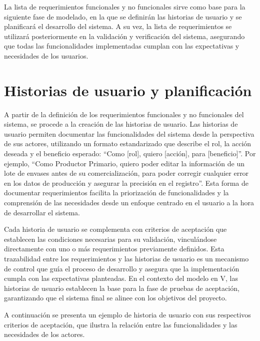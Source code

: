 La lista de requerimientos funcionales y no funcionales sirve como base para la siguiente fase de modelado, en la que se definirán las historias de usuario y se planificará el desarrollo del sistema. A su vez, la lista de requerimientos se utilizará posteriormente en la validación y verificación del sistema, asegurando que todas las funcionalidades implementadas cumplan con las expectativas y necesidades de los usuarios.

\section{Historias de usuario y planificación}
\label{sec:user-stories}

A partir de la definición de los requerimientos funcionales y no funcionales del sistema, se procede a la creación de las historias de usuario. Las historias de usuario permiten documentar las funcionalidades del sistema desde la perspectiva de sus actores, utilizando un formato estandarizado que describe el rol, la acción deseada y el beneficio esperado: ``Como [rol], quiero [acción], para [beneficio]''. Por ejemplo, ``Como Productor Primario, quiero poder editar la información de un lote de envases antes de su comercialización, para poder corregir cualquier error en los datos de producción y asegurar la precisión en el registro''. Esta forma de documentar requerimientos facilita la priorización de funcionalidades y la comprensión de las necesidades desde un enfoque centrado en el usuario a la hora de desarrollar el sistema.

Cada historia de usuario se complementa con criterios de aceptación que establecen las condiciones necesarias para su validación, vinculándose directamente con uno o más requerimientos previamente definidos. Esta trazabilidad entre los requerimientos y las historias de usuario es un mecanismo de control que guía el proceso de desarrollo y asegura que la implementación cumpla con las expectativas planteadas. En el contexto del modelo en V, las historias de usuario establecen la base para la fase de pruebas de aceptación, garantizando que el sistema final se alinee con los objetivos del proyecto.

A continuación se presenta un ejemplo de historia de usuario con sus respectivos criterios de aceptación, que ilustra la relación entre las funcionalidades y las necesidades de los actores.

